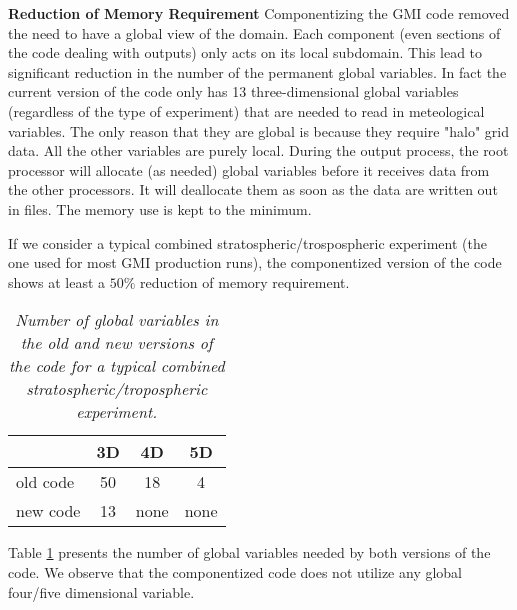 \documentclass[11pt]{article}
\begin{document}
\vskip 0.60cm


\noindent
{\bf Reduction of Memory Requirement} \newline
Componentizing the GMI code removed the need to have a global view of the domain.
Each component (even sections of the code dealing with outputs) only acts on
its local subdomain.
This lead to significant reduction in the number of the permanent global variables.
In fact the current version of the code only has 13 three-dimensional 
global variables  (regardless of the type of experiment) that
are needed to read in meteological variables. 
The only reason that they are global is because they require "halo" grid data.
All the other variables are purely local. 
During the output process, the root processor will allocate (as needed)
global variables before it receives data from the other processors.
It will deallocate them as soon as the data are written out in files.
The memory use is kept to the minimum.

If we consider a typical combined stratospheric/trospospheric experiment
(the one used for most GMI production runs), the componentized version
of the code shows at least a $50\%$ reduction of memory requirement.
%
\begin{table}[!h]
\begin{center}
\begin{tabular}{|l|c|c|c|} \hline\hline
         & 3D    &   4D   &  5D   \\ \hline\hline
old code & 50    &   18   &  4    \\
new code & 13    &  none  & none  \\ \hline\hline  
\end{tabular}
\caption{\em Number of global variables in the old and new versions of the code for a
typical combined stratospheric/tropospheric experiment.}
\label{tab:memory}
\end{center}
\end{table}
%
Table \ref{tab:memory} presents the number of global variables needed by both versions
of the code.
We observe that the componentized code does not utilize any global four/five
dimensional variable.

\vskip 0.60cm
\end{document}
